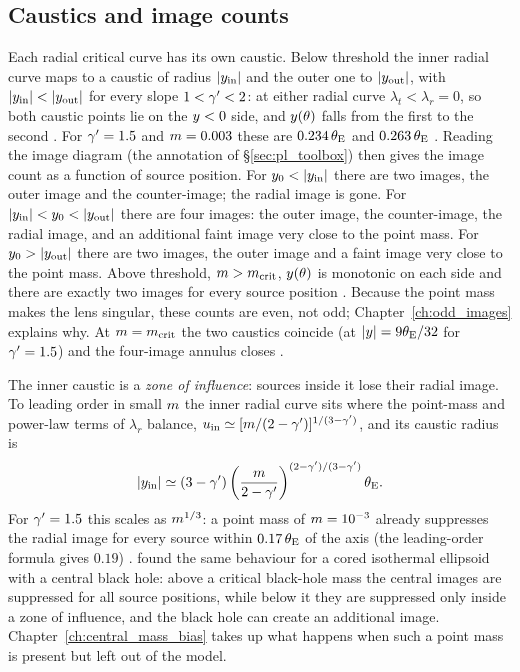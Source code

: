 \subsection{Caustics and image counts}

Each radial critical curve has its own caustic.  Below threshold the
inner radial curve maps to a caustic of radius $|y_{\rm in}|$
and the outer one to $|y_{\rm out}|$, with
$|\ysrc_{\rm in}|<|\ysrc_{\rm out}|$ for every slope $1<\gamma'<2$: at
either radial curve $\lambda_t<\lambda_r=0$, so both caustic points
lie on the $y<0$ side, and $y(\theta)$ falls from the first
to the second .  For $\gamma'=1.5$ and $m=0.003$
these are $0.234\,\theta_{\mathrm{E}}$ and $0.263\,\theta_{\mathrm{E}}$ .  Reading
the image diagram (the annotation of \S\ref{sec:pl_toolbox}) then gives
the image count as a function of source position.  For
$\ysrc_0<|\ysrc_{\rm in}|$ there are two images, the outer
image and the counter-image; the radial image is gone.  For
$|\ysrc_{\rm in}|<\ysrc_0<|\ysrc_{\rm out}|$ there are four
images: the outer image, the counter-image, the radial image,
and an additional faint image very close to the point mass.  For
$y_0>|y_{\rm out}|$ there are two images, the outer
image and a faint image very close to the point mass.
Above threshold, $m>m_{\rm crit}$, $y(\theta)$ is monotonic on
each side and there are exactly two images for every source position
.  Because the point mass makes the lens singular, these
counts are even, not odd; Chapter~\ref{ch:odd_images} explains why.  At
$m=m_{\rm crit}$ the two caustics coincide (at
$|y|=9\theta_{\mathrm{E}}/32$ for $\gamma'=1.5$) and the four-image annulus closes
.

The inner caustic is a \emph{zone of influence}: sources inside it
lose their radial image.  To leading order in small
$m$ the inner radial curve sits where the point-mass and power-law
terms of $\lambda_r$ balance, $u_{\rm in}\simeq[m/(2-\gamma')]^{1/(3-\gamma')}$,
and its caustic radius is
\begin{equation}
    |y_{\rm in}| \simeq (3-\gamma')\left(\frac{m}{2-\gamma'}\right)^{(2-\gamma')/(3-\gamma')}\theta_{\mathrm{E}} .
    \label{eq:pl_zone}
\end{equation}
For $\gamma'=1.5$ this scales as $m^{1/3}$: a point mass of
$m=10^{-3}$ already suppresses the radial image for every source
within $0.17\,\theta_{\mathrm{E}}$ of the axis (the leading-order formula gives
$0.19$) .  \citet{mao_witt_koopmans_2001} found the
same behaviour for a cored isothermal ellipsoid with a central black
hole: above a critical black-hole mass the central images are
suppressed for all source positions, while below it they are
suppressed only inside a zone of influence, and the black hole can
create an additional image.  Chapter~\ref{ch:central_mass_bias} takes up
what happens when such a point mass is present but left out of the
model.

